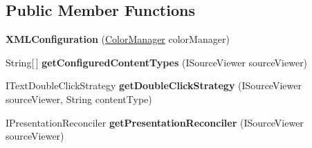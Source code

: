 \subsection*{Public Member Functions}
\begin{DoxyCompactItemize}
\item 
{\bfseries X\+M\+L\+Configuration} (\hyperlink{classcom_1_1chaintronics_1_1the78mole_1_1reqtool_1_1editors_1_1ColorManager}{Color\+Manager} color\+Manager)\hypertarget{classcom_1_1chaintronics_1_1the78mole_1_1reqtool_1_1editors_1_1XMLConfiguration_a6e10884d928f1316ffd7db44afa2dd70}{}\label{classcom_1_1chaintronics_1_1the78mole_1_1reqtool_1_1editors_1_1XMLConfiguration_a6e10884d928f1316ffd7db44afa2dd70}

\item 
String\mbox{[}$\,$\mbox{]} {\bfseries get\+Configured\+Content\+Types} (I\+Source\+Viewer source\+Viewer)\hypertarget{classcom_1_1chaintronics_1_1the78mole_1_1reqtool_1_1editors_1_1XMLConfiguration_aee9ffb7058159e5f5fe07a934cfd9672}{}\label{classcom_1_1chaintronics_1_1the78mole_1_1reqtool_1_1editors_1_1XMLConfiguration_aee9ffb7058159e5f5fe07a934cfd9672}

\item 
I\+Text\+Double\+Click\+Strategy {\bfseries get\+Double\+Click\+Strategy} (I\+Source\+Viewer source\+Viewer, String content\+Type)\hypertarget{classcom_1_1chaintronics_1_1the78mole_1_1reqtool_1_1editors_1_1XMLConfiguration_a9eae03526b6ed28614607a2dda80c0f7}{}\label{classcom_1_1chaintronics_1_1the78mole_1_1reqtool_1_1editors_1_1XMLConfiguration_a9eae03526b6ed28614607a2dda80c0f7}

\item 
I\+Presentation\+Reconciler {\bfseries get\+Presentation\+Reconciler} (I\+Source\+Viewer source\+Viewer)\hypertarget{classcom_1_1chaintronics_1_1the78mole_1_1reqtool_1_1editors_1_1XMLConfiguration_a551b2edc0bc078fbb4e769f163c1105e}{}\label{classcom_1_1chaintronics_1_1the78mole_1_1reqtool_1_1editors_1_1XMLConfiguration_a551b2edc0bc078fbb4e769f163c1105e}

\end{DoxyCompactItemize}
